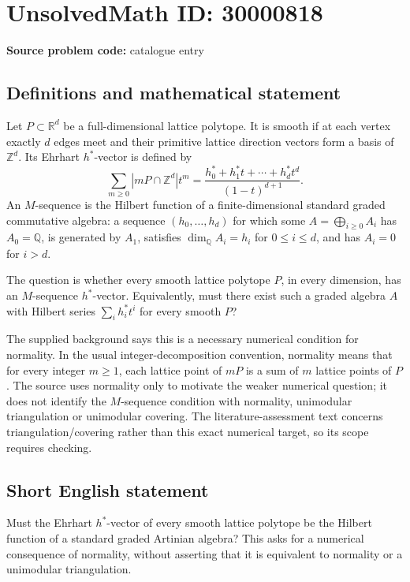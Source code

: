 \documentclass[11pt]{article}
\newcommand{\Z}{\mathbb{Z}}
\newcommand{\Q}{\mathbb{Q}}
\newcommand{\R}{\mathbb{R}}
\begin{document}
\section*{UnsolvedMath ID: 30000818}
\textbf{Source problem code:} catalogue entry
\subsection{Definitions and mathematical statement}
Let $P\subset\R^d$ be a full-dimensional lattice polytope. It is smooth if at each vertex exactly $d$ edges meet and their primitive lattice direction vectors form a basis of $\Z^d$. Its Ehrhart $h^*$-vector is defined by
\[
\sum_{m\geq0}|mP\cap\Z^d|t^m
=\frac{h_0^*+h_1^*t+\cdots+h_d^*t^d}{(1-t)^{d+1}}.
\]
An $M$-sequence is the Hilbert function of a finite-dimensional standard graded commutative algebra: a sequence $(h_0,\ldots,h_d)$ for which some $A=\bigoplus_{i\geq0}A_i$ has $A_0=\Q$, is generated by $A_1$, satisfies $\dim_\Q A_i=h_i$ for $0\leq i\leq d$, and has $A_i=0$ for $i>d$.

The question is whether every smooth lattice polytope $P$, in every dimension, has an $M$-sequence $h^*$-vector. Equivalently, must there exist such a graded algebra $A$ with Hilbert series $\sum_i h_i^*t^i$ for every smooth $P$?

The supplied background says this is a necessary numerical condition for normality. In the usual integer-decomposition convention, normality means that for every integer $m\geq1$, each lattice point of $mP$ is a sum of $m$ lattice points of $P$. The source uses normality only to motivate the weaker numerical question; it does not identify the $M$-sequence condition with normality, unimodular triangulation or unimodular covering. The literature-assessment text concerns triangulation/covering rather than this exact numerical target, so its scope requires checking.
\subsection{Short English statement}
Must the Ehrhart $h^*$-vector of every smooth lattice polytope be the Hilbert function of a standard graded Artinian algebra? This asks for a numerical consequence of normality, without asserting that it is equivalent to normality or a unimodular triangulation.
\end{document}
